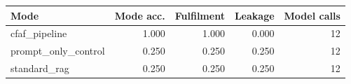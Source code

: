\begin{tabular}{lrrrr}
Mode & Mode acc. & Fulfilment & Leakage & Model calls \\
\hline
cfaf_pipeline & 1.000 & 1.000 & 0.000 & 12 \\
prompt_only_control & 0.250 & 0.250 & 0.250 & 12 \\
standard_rag & 0.250 & 0.250 & 0.250 & 12 \\
\end{tabular}
